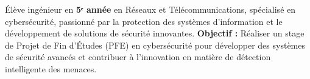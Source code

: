 
\begin{cvparagraph}

    Élève ingénieur en \textbf{5ᵉ année}  en Réseaux et Télécommunications, spécialisé en cybersécurité, passionné par la protection des systèmes d'information et le développement de solutions de sécurité innovantes.
    \newline
    \textbf{Objectif :} Réaliser un stage de Projet de Fin d'Études (PFE) en cybersécurité pour développer des systèmes de sécurité avancés et contribuer à l'innovation en matière de détection intelligente des menaces.

\end{cvparagraph}
